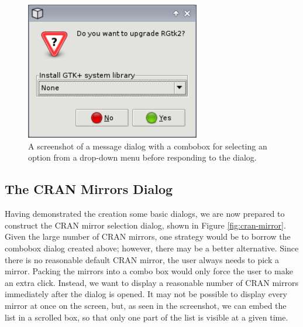 \documentclass[article]{jss}
\begin{document}
\begin{figure}
\begin{center}
\includegraphics[width=3in]{combo-dialog.png}
\caption{\label{fig:combo-dialog}A screenshot of a message dialog with
a 
combobox for selecting an option from a drop-down menu before
responding to
the dialog.}
\end{center}
\end{figure}

\subsection{The CRAN Mirrors Dialog}

Having demonstrated the creation some basic dialogs, we are now
prepared to construct the CRAN mirror selection dialog, shown in
Figure \ref{fig:cran-mirror}.  Given the large number of CRAN mirrors,
one strategy would be to borrow the combobox dialog created above;
however, there may be a better alternative. Since there is no
reasonable default CRAN mirror, the user always needs to pick a
mirror. Packing the mirrors into a combo box would only force the user
to make an extra click.  Instead, we want to display a reasonable
number of CRAN mirrors immediately after the dialog is opened. It may
not be possible to display every mirror at once on the screen, but, as
seen in the screenshot, we can embed the list in a scrolled box, so
that only one part of the list is visible at a given time.
\end{document}
